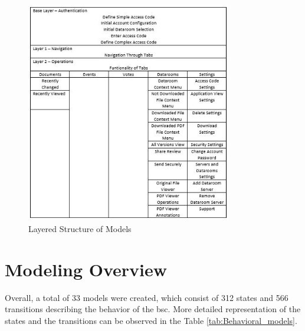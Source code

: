 \begin{figure} [htbp!]
	\centering
					\includegraphics[width=0.8\textwidth]{figures/Layers}
					\caption{\label{Fig:Layers} Layered Structure of Models}
\end{figure}

\section{Modeling Overview}
\par
Overall, a total of 33 models were created, which consist of 312 states and 566 transitions describing the behavior of the \acrshort{bsc}. More detailed representation of the states and the transitions can be observed in the Table \ref{tab:Behavioral_models}.


